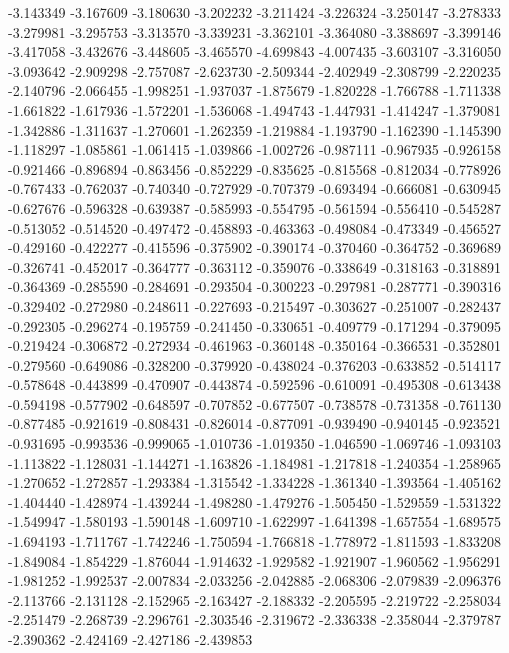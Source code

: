 -3.143349
-3.167609
-3.180630
-3.202232
-3.211424
-3.226324
-3.250147
-3.278333
-3.279981
-3.295753
-3.313570
-3.339231
-3.362101
-3.364080
-3.388697
-3.399146
-3.417058
-3.432676
-3.448605
-3.465570
-4.699843
-4.007435
-3.603107
-3.316050
-3.093642
-2.909298
-2.757087
-2.623730
-2.509344
-2.402949
-2.308799
-2.220235
-2.140796
-2.066455
-1.998251
-1.937037
-1.875679
-1.820228
-1.766788
-1.711338
-1.661822
-1.617936
-1.572201
-1.536068
-1.494743
-1.447931
-1.414247
-1.379081
-1.342886
-1.311637
-1.270601
-1.262359
-1.219884
-1.193790
-1.162390
-1.145390
-1.118297
-1.085861
-1.061415
-1.039866
-1.002726
-0.987111
-0.967935
-0.926158
-0.921466
-0.896894
-0.863456
-0.852229
-0.835625
-0.815568
-0.812034
-0.778926
-0.767433
-0.762037
-0.740340
-0.727929
-0.707379
-0.693494
-0.666081
-0.630945
-0.627676
-0.596328
-0.639387
-0.585993
-0.554795
-0.561594
-0.556410
-0.545287
-0.513052
-0.514520
-0.497472
-0.458893
-0.463363
-0.498084
-0.473349
-0.456527
-0.429160
-0.422277
-0.415596
-0.375902
-0.390174
-0.370460
-0.364752
-0.369689
-0.326741
-0.452017
-0.364777
-0.363112
-0.359076
-0.338649
-0.318163
-0.318891
-0.364369
-0.285590
-0.284691
-0.293504
-0.300223
-0.297981
-0.287771
-0.390316
-0.329402
-0.272980
-0.248611
-0.227693
-0.215497
-0.303627
-0.251007
-0.282437
-0.292305
-0.296274
-0.195759
-0.241450
-0.330651
-0.409779
-0.171294
-0.379095
-0.219424
-0.306872
-0.272934
-0.461963
-0.360148
-0.350164
-0.366531
-0.352801
-0.279560
-0.649086
-0.328200
-0.379920
-0.438024
-0.376203
-0.633852
-0.514117
-0.578648
-0.443899
-0.470907
-0.443874
-0.592596
-0.610091
-0.495308
-0.613438
-0.594198
-0.577902
-0.648597
-0.707852
-0.677507
-0.738578
-0.731358
-0.761130
-0.877485
-0.921619
-0.808431
-0.826014
-0.877091
-0.939490
-0.940145
-0.923521
-0.931695
-0.993536
-0.999065
-1.010736
-1.019350
-1.046590
-1.069746
-1.093103
-1.113822
-1.128031
-1.144271
-1.163826
-1.184981
-1.217818
-1.240354
-1.258965
-1.270652
-1.272857
-1.293384
-1.315542
-1.334228
-1.361340
-1.393564
-1.405162
-1.404440
-1.428974
-1.439244
-1.498280
-1.479276
-1.505450
-1.529559
-1.531322
-1.549947
-1.580193
-1.590148
-1.609710
-1.622997
-1.641398
-1.657554
-1.689575
-1.694193
-1.711767
-1.742246
-1.750594
-1.766818
-1.778972
-1.811593
-1.833208
-1.849084
-1.854229
-1.876044
-1.914632
-1.929582
-1.921907
-1.960562
-1.956291
-1.981252
-1.992537
-2.007834
-2.033256
-2.042885
-2.068306
-2.079839
-2.096376
-2.113766
-2.131128
-2.152965
-2.163427
-2.188332
-2.205595
-2.219722
-2.258034
-2.251479
-2.268739
-2.296761
-2.303546
-2.319672
-2.336338
-2.358044
-2.379787
-2.390362
-2.424169
-2.427186
-2.439853
